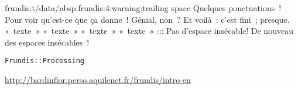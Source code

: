frundis:t/data/nbsp.frundis:4:warning:trailing space
Quelques ponctuations~! Pour voir qu'est-ce que ça donne~! Génial, non~?
Et voilà~: c'est fini~; presque. 
«~texte~»
«~texte~»
«~texte~»
«~texte~»
:::
Pas d'espace insécable!
De nouveau des espaces insécables~!

\begin{verbatim}
Frundis::Processing
\end{verbatim}
\url{http://bardinflor.perso.aquilenet.fr/frundis/intro-en}

